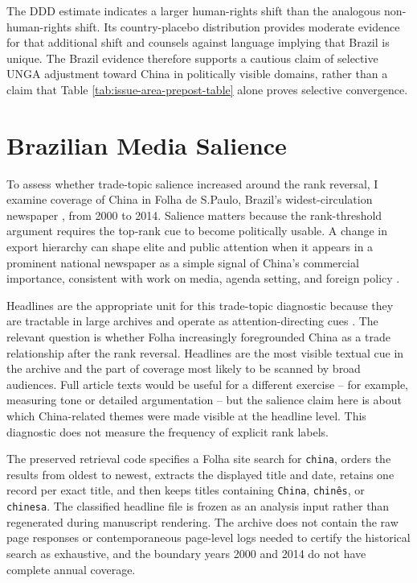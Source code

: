 \documentclass[referee,pdflatex,sn-basic]{sn-jnl}
\theoremstyle{thmstylethree}
\begin{document}
The DDD estimate indicates a larger human-rights shift than the analogous non-human-rights shift. Its country-placebo distribution provides moderate evidence for that additional shift and counsels against language implying that Brazil is unique. The Brazil evidence therefore supports a cautious claim of selective UNGA adjustment toward China in politically visible domains, rather than a claim that Table \ref{tab:issue-area-prepost-table} alone proves selective convergence.

\section{Brazilian Media Salience}\label{brazilian-media-salience}

To assess whether trade-topic salience increased around the rank reversal, I examine coverage of China in Folha de S.Paulo, Brazil's widest-circulation newspaper \citep{folha2016}, from 2000 to 2014. Salience matters because the rank-threshold argument requires the top-rank cue to become politically usable. A change in export hierarchy can shape elite and public attention when it appears in a prominent national newspaper as a simple signal of China's commercial importance, consistent with work on media, agenda setting, and foreign policy \citep{soroka2003, baum_potter2008, walgraveContingencyMassMedias2006}.

Headlines are the appropriate unit for this trade-topic diagnostic because they are tractable in large archives and operate as attention-directing cues \citep{zhang_yu2024_chinese_dream}. The relevant question is whether Folha increasingly foregrounded China as a trade relationship after the rank reversal. Headlines are the most visible textual cue in the archive and the part of coverage most likely to be scanned by broad audiences. Full article texts would be useful for a different exercise -- for example, measuring tone or detailed argumentation -- but the salience claim here is about which China-related themes were made visible at the headline level. This diagnostic does not measure the frequency of explicit rank labels.

The preserved retrieval code specifies a Folha site search for \texttt{china}, orders the results from oldest to newest, extracts the displayed title and date, retains one record per exact title, and then keeps titles containing \texttt{China}, \texttt{chinês}, or \texttt{chinesa}. The classified headline file is frozen as an analysis input rather than regenerated during manuscript rendering. The archive does not contain the raw page responses or contemporaneous page-level logs needed to certify the historical search as exhaustive, and the boundary years 2000 and 2014 do not have complete annual coverage.
\end{document}
